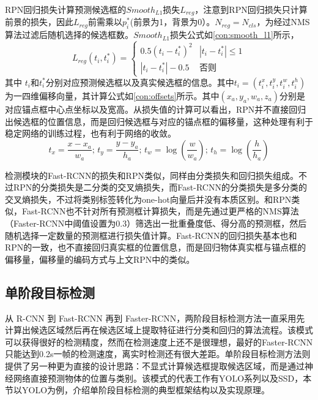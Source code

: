 RPN回归损失计算预测候选框的$Smooth_{L1}$损失$L_{reg}$，注意到RPN回归损失只计算前景的损失，因此$L_{reg}$前需乘以$p^*_i$(前景为1，背景为0）。$N_{reg} = N_{cls}$，为经过NMS算法过滤后随机选择的候选框数。$Smooth_{L1}$损失公式如\ref{con:smooth_l1}所示，
\begin{equation}
L_{reg}(t_i,t^*_i) = 
\begin{cases}
0.5(t_i-t^*_i)^2 & |t_i-t^*_i| \leq 1 \\
|t_i-t^*_i| - 0.5 & \text{否则}
\end{cases}
\label{con:smooth_l1}
\end{equation}
其中 $t_i$和$t^*_i$分别对应预测候选框以及真实候选框的信息。其中$t_i = (t^x_i, t^y_i,t^w_i,t^h_i)$ 为一四维偏移向量，其计算公式如\ref{con:offsets}所示。其中$(x_a,y_a,w_a,z_a)$分别是对应锚点框中心点坐标以及宽高。从损失值的计算可以看出，RPN并不直接回归出候选框的位置信息，而是回归候选框与对应的锚点框的偏移量，这种处理有利于稳定网络的训练过程，也有利于网络的收敛。
\begin{equation}
t_x = \frac{x - x_{a}}{w_{a}}; \, t_y = \frac{y - y_{a}}{h_{a}}; \,
t_w = \log(\frac{w}{w_{a}}); \, t_h = \log(\frac{h}{h_{a}})
\label{con:offsets}
\end{equation}

检测模块的Fast-RCNN的损失和RPN类似，同样由分类损失和回归损失组成。不过RPN的分类损失是二分类的交叉熵损失，而Fast-RCNN的分类损失是多分类的交叉熵损失，不过将类别标签转化为one-hot向量后并没有本质区别。和RPN类似，Fast-RCNN也不针对所有预测框计算损失，而是先通过更严格的NMS算法（Faster-RCNN中阈值设置为0.3）筛选出一批重叠度低、得分高的预测框，然后随机选择一定数量的预测框进行损失值计算。Fast-RCNN的回归损失基本也和RPN的一致，也不直接回归真实框的位置信息，而是回归物体真实框与锚点框的偏移量，偏移量的编码方式与上文RPN中的类似。

\subsection{单阶段目标检测}
\label{one-stage}
从 R-CNN 到 Fast-RCNN 再到 Faster-RCNN，两阶段目标检测方法一直采用先计算出候选区域然后再在候选区域上提取特征进行分类和回归的算法流程。该模式可以获得很好的检测精度，然而在检测速度上还不是很理想，最好的Faster-RCNN只能达到0.2s一帧的检测速度，离实时检测还有很大差距。单阶段目标检测方法则提供了另一种更为直接的设计思路：不显式计算候选框提取候选区域，而是通过神经网络直接预测物体的位置与类别。该模式的代表工作有YOLO\cite{redmon2016you}系列以及SSD\cite{liu2016ssd}，本节以YOLO为例，介绍单阶段目标检测的典型框架结构以及实现原理。


